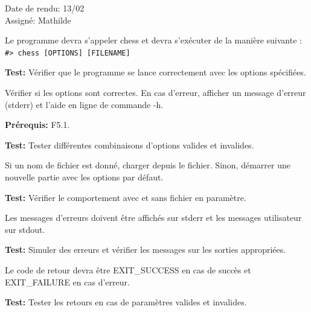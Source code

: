 \documentclass{article}
\begin{document}
\begin{needbox}
    \begin{duedatebox}
        Date de rendu: 13/02\\
        Assigné: Mathilde
    \end{duedatebox}
    \begin{subneedbox}
        Le programme devra s’appeler chess et devra s'exécuter de la manière suivante :  
        \texttt{\#> chess [OPTIONS] [FILENAME]}

        \textbf{Test:} Vérifier que le programme se lance correctement avec les options spécifiées.
    \end{subneedbox}
    
    \begin{subneedbox}
        Vérifier si les options sont correctes. En cas d'erreur, afficher un message d'erreur (stderr) et l’aide en ligne de commande -h.

        \textbf{Prérequis:} F5.1.

        \textbf{Test:} Tester différentes combinaisons d'options valides et invalides.
    \end{subneedbox}
    
    \begin{subneedbox}
        Si un nom de fichier est donné, charger depuis le fichier. Sinon, démarrer une nouvelle partie avec les options par défaut.

        \textbf{Test:} Vérifier le comportement avec et sans fichier en paramètre.
    \end{subneedbox}
    
    \begin{subneedbox}
        Les messages d’erreurs doivent être affichés sur stderr et les messages utilisateur sur stdout.

        \textbf{Test:} Simuler des erreurs et vérifier les messages sur les sorties appropriées.
    \end{subneedbox}
    
    \begin{subneedbox}
        Le code de retour devra être EXIT\_SUCCESS en cas de succès et EXIT\_FAILURE en cas d’erreur.

        \textbf{Test:} Tester les retours en cas de paramètres valides et invalides.
    \end{subneedbox}
\end{needbox}
\end{document}
